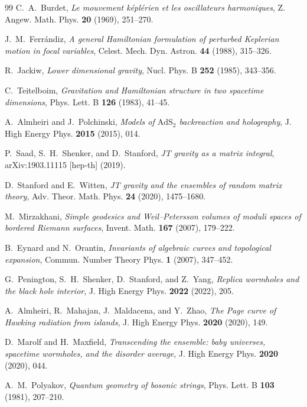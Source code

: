 \documentclass[11pt,a4paper,reqno]{article}
\theoremstyle{plain}
\theoremstyle{definition}
\theoremstyle{remark}
\numberwithin{equation}{section}
\begin{document}
\begin{thebibliography}{99}
C.~A.~Burdet,
\textit{Le mouvement k\'{e}pl\'{e}rien et les oscillateurs harmoniques},
Z. Angew. Math. Phys. \textbf{20} (1969), 251--270.

J.~M.~Ferr\'{a}ndiz,
\textit{A general Hamiltonian formulation of perturbed Keplerian motion in focal variables},
Celest. Mech. Dyn. Astron. \textbf{44} (1988), 315--326.

R.~Jackiw,
\textit{Lower dimensional gravity},
Nucl. Phys. B \textbf{252} (1985), 343--356.

C.~Teitelboim,
\textit{Gravitation and Hamiltonian structure in two spacetime dimensions},
Phys. Lett. B \textbf{126} (1983), 41--45.

A.~Almheiri and J.~Polchinski,
\textit{Models of $\mathrm{AdS}_2$ backreaction and holography},
J. High Energy Phys. \textbf{2015} (2015), 014.

P.~Saad, S.~H.~Shenker, and D.~Stanford,
\textit{JT gravity as a matrix integral},
arXiv:1903.11115 [hep-th] (2019).

D.~Stanford and E.~Witten,
\textit{JT gravity and the ensembles of random matrix theory},
Adv. Theor. Math. Phys. \textbf{24} (2020), 1475--1680.

M.~Mirzakhani,
\textit{Simple geodesics and Weil--Petersson volumes of moduli spaces of bordered Riemann surfaces},
Invent. Math. \textbf{167} (2007), 179--222.

B.~Eynard and N.~Orantin,
\textit{Invariants of algebraic curves and topological expansion},
Commun. Number Theory Phys. \textbf{1} (2007), 347--452.

G.~Penington, S.~H.~Shenker, D.~Stanford, and Z.~Yang,
\textit{Replica wormholes and the black hole interior},
J. High Energy Phys. \textbf{2022} (2022), 205.

A.~Almheiri, R.~Mahajan, J.~Maldacena, and Y.~Zhao,
\textit{The Page curve of Hawking radiation from islands},
J. High Energy Phys. \textbf{2020} (2020), 149.

D.~Marolf and H.~Maxfield,
\textit{Transcending the ensemble: baby universes, spacetime wormholes, and the disorder average},
J. High Energy Phys. \textbf{2020} (2020), 044.

A.~M.~Polyakov,
\textit{Quantum geometry of bosonic strings},
Phys. Lett. B \textbf{103} (1981), 207--210.


\end{thebibliography}
\end{document}
